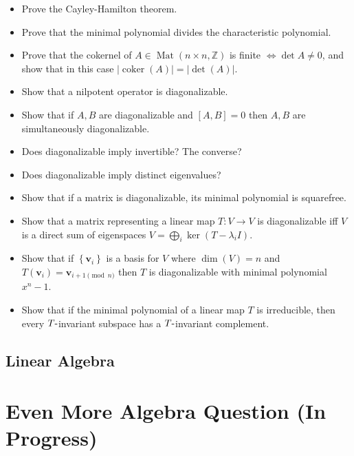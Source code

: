 \begin{itemize}
\tightlist
\item
  Prove the Cayley-Hamilton theorem.
\item
  Prove that the minimal polynomial divides the characteristic
  polynomial.
\item
  Prove that the cokernel of
  \(A\in \operatorname{Mat}(n\times n, {\mathbb{Z}})\) is finite
  \(\iff \det A \neq 0\), and show that in this case
  \({\left\lvert {\operatorname{coker}(A)} \right\rvert} = {\left\lvert {\det(A)} \right\rvert}\).
\item
  Show that a nilpotent operator is diagonalizable.
\item
  Show that if \(A,B\) are diagonalizable and \([A, B] = 0\) then
  \(A,B\) are simultaneously diagonalizable.
\item
  Does diagonalizable imply invertible? The converse?
\item
  Does diagonalizable imply distinct eigenvalues?
\item
  Show that if a matrix is diagonalizable, its minimal polynomial is
  squarefree.
\item
  Show that a matrix representing a linear map \(T:V\to V\) is
  diagonalizable iff \(V\) is a direct sum of eigenspaces
  \(V = \bigoplus_i \ker(T -\lambda_i I)\).
\item
  Show that if \(\left\{{\mathbf{v}_i}\right\}\) is a basis for \(V\)
  where \(\dim(V) = n\) and
  \(T(\mathbf{v}_i) = \mathbf{v}_{i+1 \pmod n}\) then \(T\) is
  diagonalizable with minimal polynomial \(x^n-1\).
\item
  Show that if the minimal polynomial of a linear map \(T\) is
  irreducible, then every \(T{\hbox{-}}\)invariant subspace has a
  \(T{\hbox{-}}\)invariant complement.
\end{itemize}

\hypertarget{linear-algebra-1}{%
\subsection{Linear Algebra}\label{linear-algebra-1}}


\hypertarget{even-more-algebra-question-in-progress}{%
\section{Even More Algebra Question (In
Progress)}\label{even-more-algebra-question-in-progress}}

